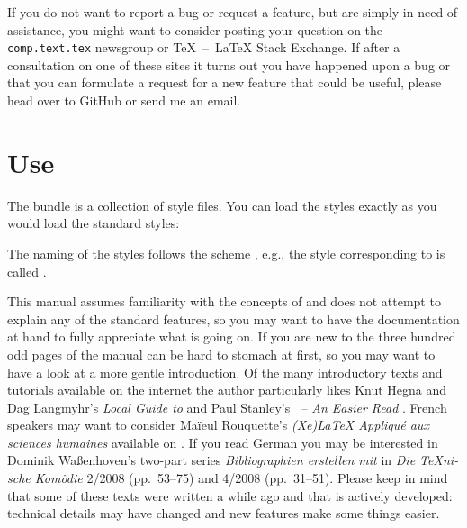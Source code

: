 \documentclass[DIV=9]{scrartcl}
\def\tex{TeX}%
\def\latex{LaTeX}%
\newcommand*{\ctan}{\mkbibacro{CTAN}}
\begin{document}
If you do not want to report a bug or request a feature, but are simply in need
of assistance, you might want to consider posting your question on the
\texttt{comp.text.tex} newsgroup or \tex{}~--~\latex{} Stack Exchange.%
If after a consultation on one of these sites it turns out you have happened
upon a bug or that you can formulate a request for a new feature that could be
useful, please head over to GitHub or send me an email.

\section{Use}\label{sec:use}
The  bundle is a collection of  style files.
You can load the styles exactly as you would load the standard styles:
\begin{biblatexcode}
\usepackage[style=(*@@*)]{biblatex}
\end{biblatexcode}
The naming of the styles follows the scheme
\mbox{}, e.g.,
the style corresponding to  is called
.

This manual assumes familiarity with the concepts of  and does
not attempt to explain any of the standard  features, so you may
want to have the  documentation%
at hand to fully appreciate what is going on.
If you are new to  the three hundred odd pages of the manual
can be hard to stomach at first, so you may want to have a look at a more
gentle introduction.
Of the many introductory texts and tutorials available on the internet%
the author particularly likes
Knut Hegna and Dag Langmyhr's \emph{Local Guide to }%
and Paul Stanley's \emph{~-- An Easier Read}%
.
French speakers may want to consider Maïeul Rouquette's
\foreignlanguage{french}{\emph{(Xe)\LaTeX{} Appliqué aux sciences humaines}}
available on \ctan{}.
If you read German you may be interested in Dominik Waßenhoven's two-part
series \foreignlanguage{ngerman}{\emph{Bibliographien erstellen mit
}} in \foreignlanguage{ngerman}{\emph{Die \TeX nische Komödie}}
2/2008 (pp.~53--75)
and 4/2008 (pp.~31--51).
Please keep in mind that some of these texts were written a while ago and
that  is actively developed: technical details may have changed
and new features make some things easier.
\end{document}
